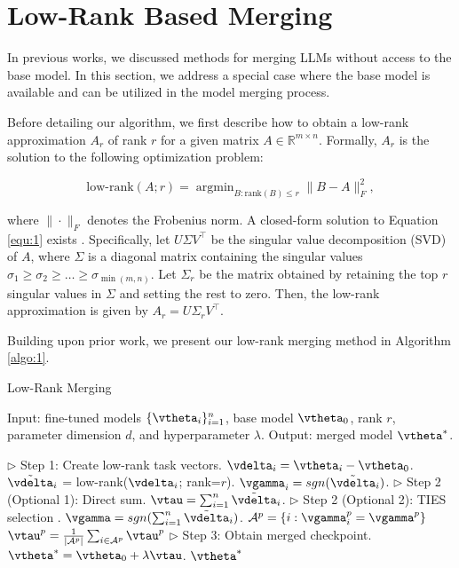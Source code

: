 \section{Low-Rank Based Merging}

In previous works, we discussed methods for merging LLMs without access to the base model.
In this section, we address a special case where the base model is available and can be utilized in the model merging process.

Before detailing our algorithm, we first describe how to obtain a low-rank approximation $A_r$ of rank $r$ for a given matrix $A \in \mathbb{R}^{m \times n}$. Formally, $A_r$ is the solution to the following optimization problem:

\begin{equation} \label{equ:1}
\textrm{low-rank}(A;r) = \mathop{\arg\min}_{B: \text{rank}(B) \leq r} \| B - A \|_F^2,
\end{equation}

where $\| \cdot \|_F$ denotes the Frobenius norm. A closed-form solution to Equation \ref{equ:1} exists \citep{householder_2013_theory}. Specifically, let $U \Sigma V^\top$ be the singular value decomposition (SVD) of $A$, where $\Sigma$ is a diagonal matrix containing the singular values $\sigma_1 \geq \sigma_2 \geq \dots \geq \sigma_{\min (m, n)}$. Let $\Sigma_r$ be the matrix obtained by retaining the top $r$ singular values in $\Sigma$ and setting the rest to zero. Then, the low-rank approximation is given by $A_r = U \Sigma_r V^\top$.

Building upon prior work, we present our low-rank merging method in Algorithm \ref{algo:1}. 

\begin{algorithm}[ht]

\caption{Low-Rank Merging}
\label{algo:1}

Input: fine-tuned models $\{ \vtheta_i \}_{i=1}^n$, base model $\vtheta_0$, rank $r$, parameter dimension $d$, and hyperparameter $\lambda$.
Output: merged model $\vtheta^*$.

\begin{algorithmic}
\STATE $\rhd$ Step 1: Create low-rank task vectors.
\STATE $\vdelta_i = \vtheta_i - \vtheta_0$.
\STATE $\tilde{\vdelta}_i$ = low-rank($\vdelta_i$; rank=$r$).
\STATE $\vgamma_i = sgn(\tilde{\vdelta}_i)$.
\ENDFOR
\STATE
\STATE $\rhd$ Step 2 (Optional 1): Direct sum.
\STATE $\vtau = \sum_{i=1}^n \tilde{\vdelta}_i$.
\STATE
\STATE $\rhd$ Step 2 (Optional 2): TIES selection \citep{yadav_2024_ties}.
\STATE $\vgamma = sgn(\sum_{i=1}^n \tilde{\vdelta}_i)$.
\STATE $\mathcal{A}^p = \{i:  \vgamma_i^p = \vgamma^p \}$
\STATE $\vtau^p = \frac{1}{|\mathcal{A}^p|} \sum_{i \in \mathcal{A}^p} \vtau^p$
\ENDFOR
\STATE
\STATE $\rhd$ Step 3: Obtain merged checkpoint.
\STATE $\vtheta^* = \vtheta_0 + \lambda \vtau$.
\RETURN $\vtheta^*$
\end{algorithmic}

\end{algorithm}

